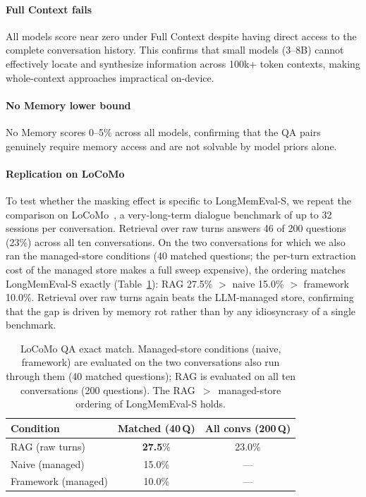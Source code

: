 \documentclass[10pt, twocolumn]{article}
\begin{document}
\paragraph{Full Context fails}
All models score near zero under Full Context despite having direct
access to the complete conversation history.
This confirms that small models (3--8B) cannot effectively locate and
synthesize information across 100k+ token contexts, making whole-context
approaches impractical on-device.

\paragraph{No Memory lower bound}
No Memory scores 0--5\% across all models, confirming that the QA pairs
genuinely require memory access and are not solvable by model priors alone.

\paragraph{Replication on LoCoMo}
To test whether the masking effect is specific to LongMemEval-S, we repeat the
comparison on LoCoMo~\cite{maharana2024evaluating}, a very-long-term dialogue
benchmark of up to 32 sessions per conversation. Retrieval over raw turns answers
46 of 200 questions (23\%) across all ten conversations. On the two conversations
for which we also ran the managed-store conditions (40 matched questions; the
per-turn extraction cost of the managed store makes a full sweep expensive), the
ordering matches LongMemEval-S exactly (Table~\ref{tab:locomo}): RAG 27.5\% $>$
naive 15.0\% $>$ framework 10.0\%. Retrieval over raw turns again beats the
LLM-managed store, confirming that the gap is driven by memory rot rather than by
any idiosyncrasy of a single benchmark.

\begin{table}[t]
\centering
\caption{LoCoMo QA exact match. Managed-store conditions (naive, framework) are
  evaluated on the two conversations also run through them (40 matched questions);
  RAG is evaluated on all ten conversations (200 questions). The
  RAG~$>$~managed-store ordering of LongMemEval-S holds.}
\label{tab:locomo}
\small
\begin{tabular}{lcc}
\toprule
\textbf{Condition} & \textbf{Matched (40\,Q)} & \textbf{All convs (200\,Q)} \\
\midrule
RAG (raw turns)     & \textbf{27.5}\% & 23.0\% \\
Naive (managed)     & 15.0\% & --- \\
Framework (managed) & 10.0\% & --- \\
\bottomrule
\end{tabular}
\end{table}
\end{document}
